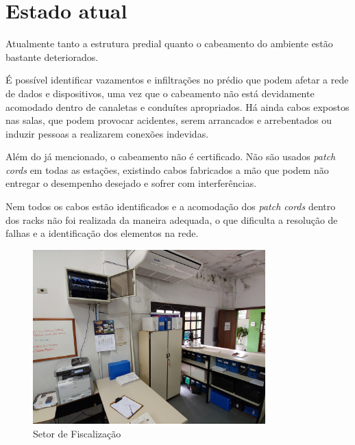 \documentclass[	DIV=calc,%
							paper=a4,%
							fontsize=12pt,%
							onecolumn]{scrartcl}	 					%
\begin{document}
\section{Estado atual}
Atualmente tanto a estrutura predial quanto o cabeamento do ambiente estão bastante deteriorados.\par
É possível identificar vazamentos e infiltrações no prédio que podem afetar a rede de dados e dispositivos, uma vez que o cabeamento não está devidamente acomodado dentro de canaletas e conduítes apropriados. Há ainda cabos expostos nas salas, que podem provocar acidentes, serem arrancados e arrebentados ou induzir pessoas a realizarem conexões indevidas.\par
Além do já mencionado, o cabeamento não é certificado. Não são usados \textit{patch cords} em todas as estações, existindo cabos fabricados a mão que podem não entregar o desempenho desejado e sofrer com interferências.\par
Nem todos os cabos estão identificados e a acomodação dos \textit{patch cords} dentro dos racks não foi realizada da maneira adequada, o que dificulta a resolução de falhas e a identificação dos elementos na rede.
\begin{figure}[h!]
	\centering
	\includegraphics[width=0.8\textwidth]{figura10.jpg}
	\caption[Setor de Fiscalização]{Setor de Fiscalização}
	\label{figura10}
\end{figure}
\end{document}

